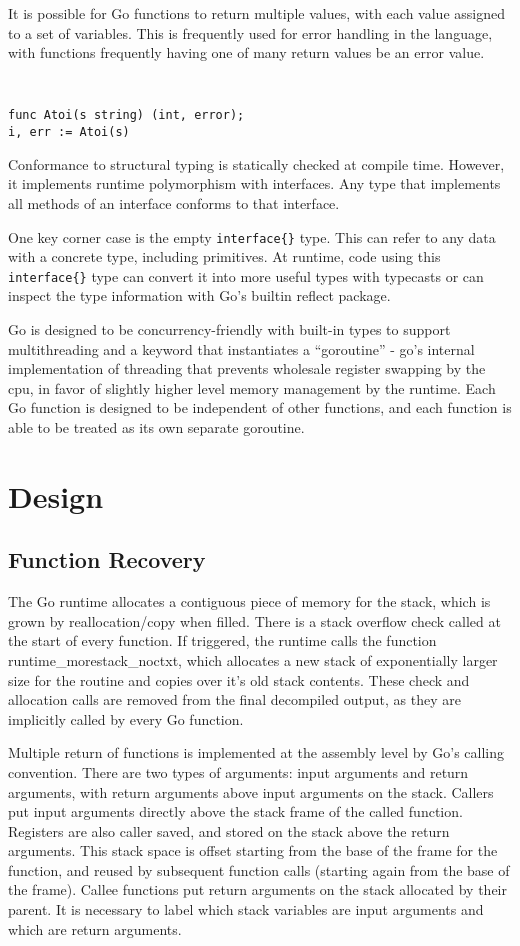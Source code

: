 \documentclass[letterpaper,twocolumn,10pt]{article}
\begin{document}
It is possible for Go functions to return multiple values, with each value assigned to a set of variables. This is frequently used for error handling in the language, with functions frequently having one of many return values be an error value.
{\tt \small
\begin{verbatim}
func Atoi(s string) (int, error);
i, err := Atoi(s)    
\end{verbatim}
}

Conformance to structural typing is statically checked at compile time. However, it implements runtime polymorphism with interfaces. Any type that implements all methods of an interface conforms to that interface. 

One key corner case is the empty \texttt{interface\{\}} type. This can refer to any data with a concrete type, including primitives. At runtime, code using this \texttt{interface\{\}} type can convert it into more useful types with typecasts or can inspect the type information with Go’s builtin reflect package.

Go is designed to be concurrency-friendly with built-in types to support multithreading and a keyword that instantiates a “goroutine” - go’s internal implementation of threading that prevents wholesale register swapping by the cpu, in favor of slightly higher level memory management by the runtime. Each Go function is designed to be independent of other functions, and each function is able to be treated as its own separate goroutine. 

\section{Design}
\subsection{Function Recovery}
The Go runtime allocates a contiguous piece of memory for the stack, which is grown by reallocation/copy when filled. There is a stack overflow check called at the start of every function. If triggered, the runtime calls the function runtime\_morestack\_noctxt, which allocates a new stack of exponentially larger size for the routine and copies over it’s old stack contents. These check and allocation calls are removed from the final decompiled output, as they are implicitly called by every Go function.

Multiple return of functions is implemented at the assembly level by Go’s calling convention. There are two types of arguments: input arguments and return arguments, with return arguments above input arguments on the stack. Callers put input arguments directly above the stack frame of the called function. Registers are also caller saved, and stored on the stack above the return arguments. This stack space is offset starting from the base of the frame for the function, and reused by subsequent function calls (starting again from the base of the frame). Callee functions put return arguments on the stack allocated by their parent. It is necessary to label which stack variables are input arguments and which are return arguments.
\end{document}

